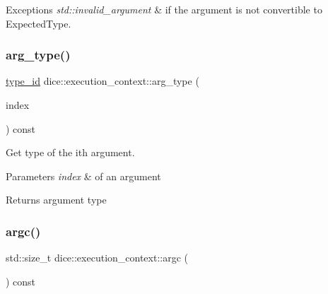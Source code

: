 \begin{DoxyExceptions}{Exceptions}
{\em std\+::invalid\+\_\+argument} & if the argument is not convertible to Expected\+Type. \\
\hline
\end{DoxyExceptions}
\mbox{\label{classdice_1_1execution__context_a346132ca9cc451ddafccca8fe67213ba}} 
\subsubsection{\texorpdfstring{arg\+\_\+type()}{arg\_type()}}
{\footnotesize\ttfamily \mbox{\hyperlink{value_8hpp_ab9af7d8ecc381e026ca4d07a745f23eb}{type\+\_\+id}} dice\+::execution\+\_\+context\+::arg\+\_\+type (\begin{DoxyParamCaption}\item[{std\+::size\+\_\+t}]{index }\end{DoxyParamCaption}) const\hspace{0.3cm}{\ttfamily [inline]}}



Get type of the ith argument. 


\begin{DoxyParams}{Parameters}
{\em index} & of an argument\\
\hline
\end{DoxyParams}
\begin{DoxyReturn}{Returns}
argument type 
\end{DoxyReturn}
\mbox{\label{classdice_1_1execution__context_a1af91def04d331d9564f2519577b4283}} 
\subsubsection{\texorpdfstring{argc()}{argc()}}
{\footnotesize\ttfamily std\+::size\+\_\+t dice\+::execution\+\_\+context\+::argc (\begin{DoxyParamCaption}{ }\end{DoxyParamCaption}) const\hspace{0.3cm}{\ttfamily [inline]}}



